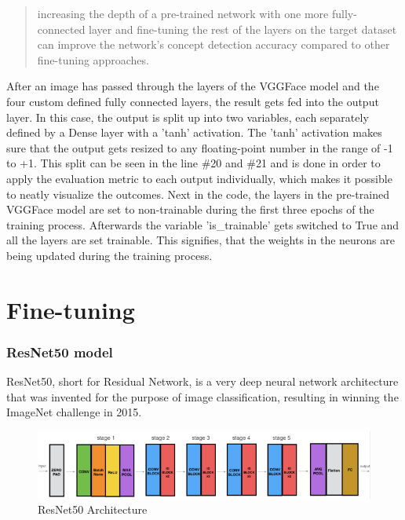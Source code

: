 \begin{quote}
    increasing the depth of a pre-trained network with one more fully-connected layer and fine-tuning the rest of the layers on the target dataset can improve the network’s concept detection accuracy compared to other fine-tuning approaches. \citep{Pittaras:2017:FineTuningStrategiesComparison}
\end{quote}

After an image has passed through the layers of the VGGFace model and the four custom defined fully connected layers, the result gets fed into the output layer. In this case, the output is split up into two variables, each separately defined by a Dense layer with a 'tanh' activation. The 'tanh' activation makes sure that the output gets resized to any floating-point number in the range of -1 to +1.
\newline
This split can be seen in the line \#20 and \#21 and is done in order to apply the evaluation metric to each output individually, which makes it possible to neatly visualize the outcomes.
\newline\newline
Next in the code, the layers in the pre-trained VGGFace model are set to non-trainable during the first three epochs of the training process. Afterwards the variable 'is\_trainable' gets switched to True and all the layers are set trainable. This signifies, that the weights in the neurons are being updated during the training process.



\section{Fine-tuning}
\subsubsection{ResNet50 model}
ResNet50, short for Residual Network, is a very deep neural network architecture that was invented for the purpose of image classification, resulting in winning the ImageNet challenge in 2015. \citep{Dwivedi:2019:ResNetInKeras}

\begin{figure}[H]
  \begin{center}
  \includegraphics[angle=0, width=1.0\textwidth]{Figures/resnet50.png}
  \caption{ResNet50 Architecture \citep{Dwivedi:2019:ResNetInKeras}}
  \label{fig:ResNet50Architecture}
  \end{center}
\end{figure}

